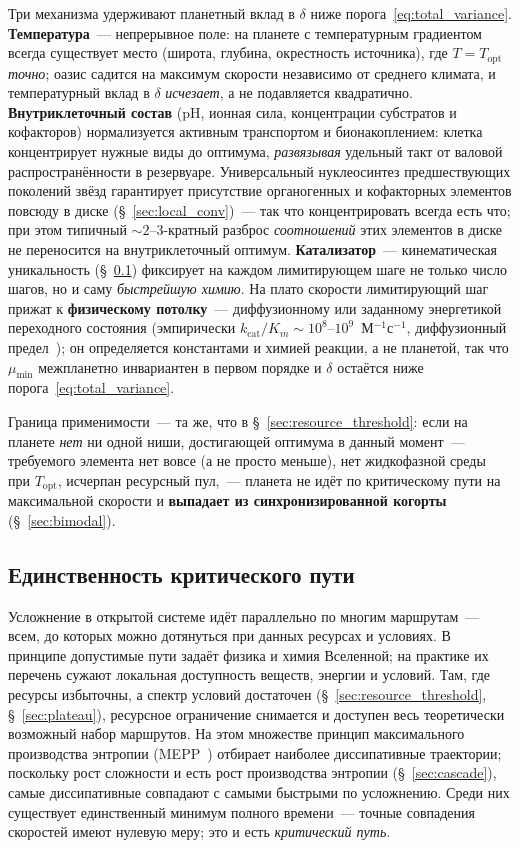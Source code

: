 \documentclass[12pt,a4paper]{article}
\begin{document}
Три механизма удерживают планетный вклад в $\delta$ ниже порога~\eqref{eq:total_variance}. \textbf{Температура}~--- непрерывное поле: на
планете с температурным градиентом всегда существует место (широта, глубина,
окрестность источника), где $T = T_{\mathrm{opt}}$ \emph{точно}; оазис садится на
максимум скорости независимо от среднего климата, и температурный вклад в $\delta$
\emph{исчезает}, а не подавляется квадратично. \textbf{Внутриклеточный состав}
(pH, ионная сила, концентрации субстратов и кофакторов) нормализуется активным
транспортом и бионакоплением: клетка концентрирует нужные виды до оптимума,
\emph{развязывая} удельный такт от валовой распространённости в резервуаре.
Универсальный нуклеосинтез предшествующих поколений звёзд гарантирует присутствие
органогенных и кофакторных элементов повсюду в диске
(\S~\ref{sec:local_conv})~--- так что концентрировать всегда есть что; при этом
типичный $\sim 2$--$3$-кратный разброс \emph{соотношений} этих элементов в диске
не переносится на внутриклеточный оптимум. \textbf{Катализатор}~--- кинематическая уникальность
(\S~\ref{sec:uniqueness}) фиксирует на каждом лимитирующем шаге не только число
шагов, но и саму \emph{быстрейшую химию}. На плато скорости лимитирующий шаг прижат к
\textbf{физическому потолку}~--- диффузионному или заданному энергетикой
переходного состояния (эмпирически $k_{\mathrm{cat}}/K_m\sim10^{8}$--$10^{9}$~М$^{-1}$с$^{-1}$,
диффузионный предел~\cite{Bar-Even2011}); он определяется константами и химией
реакции, а не планетой, так что $\mu_{\min}$ межпланетно инвариантен в первом
порядке и $\delta$ остаётся ниже порога~\eqref{eq:total_variance}.

Граница применимости~--- та же, что в \S~\ref{sec:resource_threshold}: если на
планете \emph{нет} ни одной ниши, достигающей оптимума в данный момент~---
требуемого элемента нет вовсе (а не просто меньше), нет
жидкофазной среды при $T_{\mathrm{opt}}$, исчерпан ресурсный пул,~--- планета не идёт по критическому
пути на максимальной скорости и \textbf{выпадает из синхронизированной когорты}
(\S~\ref{sec:bimodal}).

\subsection{Единственность критического пути}
\label{sec:uniqueness}

Усложнение в открытой системе идёт параллельно по многим маршрутам~--- всем, до которых можно дотянуться при данных ресурсах и условиях. В принципе допустимые пути задаёт физика и химия Вселенной; на практике их перечень сужают локальная доступность веществ, энергии и условий. Там, где ресурсы избыточны, а спектр условий достаточен (\S~\ref{sec:resource_threshold}, \S~\ref{sec:plateau}), ресурсное ограничение снимается и доступен весь теоретически возможный набор маршрутов. На этом множестве принцип максимального производства энтропии (MEPP~\cite{Martyushev,MartyushevSeleznev2006,Kleidon2010,Vallino2010}) отбирает наиболее диссипативные траектории; поскольку рост сложности и есть рост производства энтропии (\S~\ref{sec:cascade}), самые диссипативные совпадают с самыми быстрыми по усложнению. Среди них существует единственный минимум полного времени~--- точные совпадения скоростей имеют нулевую меру; это и есть \emph{критический путь}.
\end{document}
